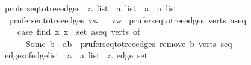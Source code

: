 \begin{isabellebody}
\isanewline
{}\isamarkupfalse%
\ prufer{\isacharunderscore}{\kern0pt}seq{\isacharunderscore}{\kern0pt}to{\isacharunderscore}{\kern0pt}tree{\isacharunderscore}{\kern0pt}edges\ {\isacharcolon}{\kern0pt}{\isacharcolon}{\kern0pt}\ {\isachardoublequoteopen}{\isacharprime}{\kern0pt}a\ list\ {\isasymRightarrow}\ {\isacharprime}{\kern0pt}a\ list\ {\isasymRightarrow}\ {\isacharparenleft}{\kern0pt}{\isacharprime}{\kern0pt}a\ {\isasymtimes}\ {\isacharprime}{\kern0pt}a{\isacharparenright}{\kern0pt}\ list{\isachardoublequoteclose}\ \isanewline
\ \ {\isachardoublequoteopen}prufer{\isacharunderscore}{\kern0pt}seq{\isacharunderscore}{\kern0pt}to{\isacharunderscore}{\kern0pt}tree{\isacharunderscore}{\kern0pt}edges\ {\isacharbrackleft}{\kern0pt}v{\isacharcomma}{\kern0pt}w{\isacharbrackright}{\kern0pt}\ {\isacharbrackleft}{\kern0pt}{\isacharbrackright}{\kern0pt}\ {\isacharequal}{\kern0pt}\ {\isacharbrackleft}{\kern0pt}{\isacharparenleft}{\kern0pt}v{\isacharcomma}{\kern0pt}w{\isacharparenright}{\kern0pt}{\isacharbrackright}{\kern0pt}{\isachardoublequoteclose}\isanewline
{\isacharbar}{\kern0pt}\ {\isachardoublequoteopen}prufer{\isacharunderscore}{\kern0pt}seq{\isacharunderscore}{\kern0pt}to{\isacharunderscore}{\kern0pt}tree{\isacharunderscore}{\kern0pt}edges\ verts\ {\isacharparenleft}{\kern0pt}a{\isacharhash}{\kern0pt}seq{\isacharparenright}{\kern0pt}\ {\isacharequal}{\kern0pt}\isanewline
\ \ \ \ {\isacharparenleft}{\kern0pt}case\ find\ {\isacharparenleft}{\kern0pt}{\isasymlambda}x{\isachardot}{\kern0pt}\ x\ {\isasymnotin}\ set\ {\isacharparenleft}{\kern0pt}a{\isacharhash}{\kern0pt}seq{\isacharparenright}{\kern0pt}{\isacharparenright}{\kern0pt}\ verts\ of\isanewline
\ \ \ \ \ \ Some\ b\ {\isasymRightarrow}\ {\isacharparenleft}{\kern0pt}a{\isacharcomma}{\kern0pt}b{\isacharparenright}{\kern0pt}\ {\isacharhash}{\kern0pt}\ prufer{\isacharunderscore}{\kern0pt}seq{\isacharunderscore}{\kern0pt}to{\isacharunderscore}{\kern0pt}tree{\isacharunderscore}{\kern0pt}edges\ {\isacharparenleft}{\kern0pt}remove{}\ b\ verts{\isacharparenright}{\kern0pt}\ seq{\isacharparenright}{\kern0pt}{\isachardoublequoteclose}\isanewline
\isanewline
{}\isamarkupfalse%
\ edges{\isacharunderscore}{\kern0pt}of{\isacharunderscore}{\kern0pt}edge{\isacharunderscore}{\kern0pt}list\ {\isacharcolon}{\kern0pt}{\isacharcolon}{\kern0pt}\ {\isachardoublequoteopen}{\isacharparenleft}{\kern0pt}{\isacharprime}{\kern0pt}a\ {\isasymtimes}\ {\isacharprime}{\kern0pt}a{\isacharparenright}{\kern0pt}\ list\ {\isasymRightarrow}\ {\isacharprime}{\kern0pt}a\ edge\ set{\isachardoublequoteclose}\ \isanewline

\end{isabellebody}
